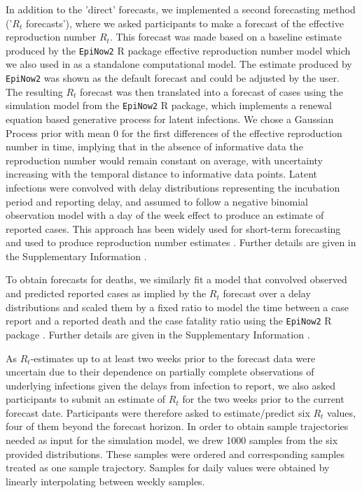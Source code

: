 \documentclass[10pt,a4paper,twocolumn]{article}
\begin{document}
In addition to the 'direct' forecasts, we implemented a second forecasting method ('$R_t$ forecasts'), where we asked participants to make a forecast of the effective reproduction number $R_t$. This forecast was made based on a baseline estimate produced by the \texttt{EpiNow2} \citep{epinow2} \textsf{R} \cite{R} package effective reproduction number model which we also used in \cite{bosseComparingHumanModelbased2022} as a standalone computational model. The estimate produced by \texttt{EpiNow2} was shown as the default forecast and could be adjusted by the user. The resulting $R_t$ forecast was then translated into a forecast of cases using the simulation model from the \texttt{EpiNow2} \textsf{R} package, which implements a renewal equation based \citep{fraserEstimatingIndividualHousehold2007} generative process for latent infections. We chose a Gaussian Process prior with mean 0 for the first differences of the effective reproduction number in time, implying that in the absence of informative data the reproduction number would remain constant on average, with uncertainty increasing with the temporal distance to informative data points. Latent infections were convolved with delay distributions representing the incubation period and reporting delay, and assumed to follow a negative binomial observation model with a day of the week effect to produce an estimate of reported cases. This approach has been widely used for short-term forecasting \cite{bosseComparingHumanModelbased2022, sherrattPredictivePerformanceMultimodel2022} and used to produce reproduction number estimates \cite{abbottEstimatingIncreaseReproduction2021, abbottEstimatingTimevaryingReproduction2020a, sherrattExploringSurveillanceData2021}. Further details are given in the Supplementary Information \cite{bosseSupplementaryInformationHuman2023}.

To obtain forecasts for deaths, we similarly fit a model that convolved observed and predicted reported cases as implied by the $R_t$ forecast over a  delay distributions \cite{sherrattExploringSurveillanceData2021, abbottEstimatingTimevaryingReproduction2020a} and scaled them by a fixed ratio to model the time between a case report and a reported death and the case fatality ratio using the \texttt{EpiNow2} \textsf{R} package \citep{epinow2}. Further details are given in the Supplementary Information \cite{bosseSupplementaryInformationHuman2023}.

As $R_t$-estimates up to at least two weeks prior to the forecast data were uncertain due to their dependence on partially complete observations of underlying infections given the delays from infection to report, we also asked participants to submit an estimate of $R_t$ for the two weeks prior to the current forecast date. Participants were therefore asked to estimate/predict six $R_t$ values, four of them beyond the forecast horizon. In order to obtain sample trajectories needed as input for the simulation model, we drew 1000 samples from the six provided distributions. These samples were ordered and corresponding samples treated as one sample trajectory. Samples for daily values were obtained by linearly interpolating between weekly samples. 
\end{document}
